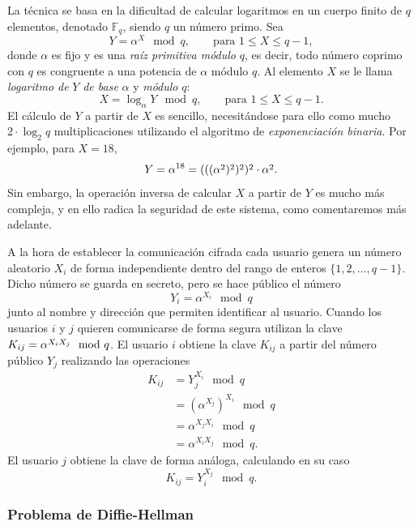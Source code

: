 \documentclass[
  a4paper,
  12pt,
  spanish,
]{scrartcl}
\begin{document}
La técnica se basa en la dificultad de calcular logaritmos en un cuerpo finito de \(q\) elementos, denotado \(\mathbb F_q\), siendo \(q\) un número primo. 
Sea \[Y = \alpha^X \mod q, \qquad \text{para } 1 \leq X \leq q - 1,\] donde \(\alpha\) es fijo y es una \textit{raíz primitiva módulo} \(q\), es decir, todo número coprimo con \(q\) es congruente a una potencia de \(\alpha\) módulo \(q\). 
Al elemento \(X\) se le llama \textit{logaritmo de} \(Y\) \textit{de base} \(\alpha\) y \textit{módulo} \(q\): \[X = \log_{\alpha} Y \mod q, \qquad \text{para } 1 \leq X \leq q - 1.\]
El cálculo de \(Y\) a partir de \(X\) es sencillo, necesitándose para ello como mucho \(2 \cdot \log_2 q\) multiplicaciones utilizando el algoritmo de \textit{exponenciación binaria}. Por ejemplo, para \(X = 18\), \[Y = \alpha^{18} = \cramped{(((\alpha^2)^2)^2)^2} \cdot \cramped{\alpha^2}.\]
Sin embargo, la operación inversa de calcular \(X\) a partir de \(Y\) es mucho más compleja, y en ello radica la seguridad de este sistema, como comentaremos más adelante.

A la hora de establecer la comunicación cifrada cada usuario genera un número aleatorio \(X_i\) de forma independiente dentro del rango de enteros \(\{1, 2, \dots, q - 1\}\). 
Dicho número se guarda en secreto, pero se hace público el número \[Y_i = \alpha^{X_i} \mod q\] junto al nombre y dirección que permiten identificar al usuario. 
Cuando los usuarios \(i\) y \(j\) quieren comunicarse de forma segura utilizan la clave \(K_{ij} = \cramped{\alpha^{X_iX_j}} \mod q\). 
El usuario \(i\) obtiene la clave \(K_{ij}\) a partir del número público \(Y_j\) realizando las operaciones \begin{align*}
  K_{ij} &= Y_j^{X_i} \mod q \\
    &= (\alpha^{X_j})^{X_i} \mod q \\
    &= \alpha^{X_jX_i} \mod q \\
    &= \alpha^{X_iX_j} \mod q.
\end{align*}
El usuario \(j\) obtiene la clave de forma análoga, calculando en su caso \[K_{ij} = Y_i^{X_j} \mod q.\]

\subsubsection{Problema de Diffie-Hellman}
\end{document}

